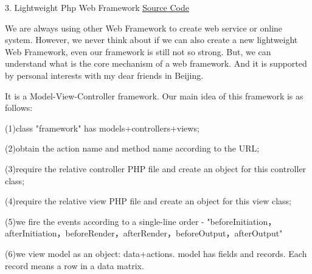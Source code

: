 \documentclass[10pt,letterpaper]{article}
\renewenvironment{itemize}{
  \begin{list}{}{
    \setlength{\leftmargin}{1.5em}
    \setlength{\itemsep}{0.25em}
    \setlength{\parskip}{0pt}
    \setlength{\parsep}{0.25em}
  }
}{
  \end{list}
}
\begin{document}
\begin{itemize}
\item  3. Lightweight Php Web Framework \href{http://github.com/pipifuyj/phpframework}{\underline{Source Code}}
	\begin{itemize}
	\item We are always using other Web Framework to create web service or online system. However, we never think about if we can also create a new lightweight Web Framework, even our framework is still not so strong. But, we can understand what is the core mechanism of a web framework. And it is supported by personal interests with my dear friends in Beijing.
	\item It is a Model-View-Controller framework. Our main idea of this framework is as follows:
	\begin{itemize}
		\item (1)class "framework" has models+controllers+views;
		\item (2)obtain the action name and method name according to the URL;
		\item (3)require the relative controller PHP file and create an object for this controller class;
		\item (4)require the relative view PHP file and create an object for this view class;
		\item (5)we fire the events according to a single-line order - "beforeInitiation，afterInitiation，beforeRender，afterRender，beforeOutput，afterOutput"
		\item (6)we view model as an object: data+actions. model has fields and records. Each record means a row in a data matrix. 
	\end{itemize}
	\end{itemize}
\end{itemize}
\end{document}
